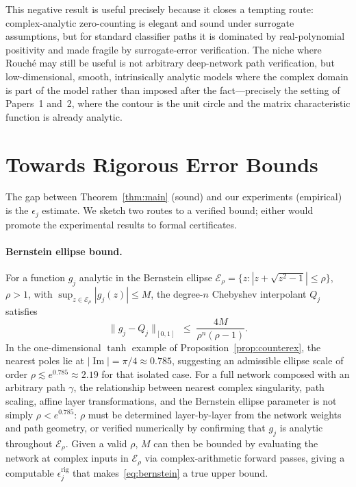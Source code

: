 \documentclass{article}
\theoremstyle{definition}
\begin{document}
This negative result is useful precisely because it closes a tempting route:
complex-analytic zero-counting is elegant and sound under surrogate
assumptions, but for standard classifier paths it is dominated by
real-polynomial positivity and made fragile by surrogate-error verification.
The niche where Rouch\'e may still be useful is not arbitrary deep-network
path verification, but low-dimensional, smooth, intrinsically analytic models
where the complex domain is part of the model rather than imposed after the
fact---precisely the setting of Papers~1 and~2, where the contour is the unit
circle and the matrix characteristic function is already analytic.

\appendix
\section{Towards Rigorous Error Bounds}
\label{app:rigorous}

The gap between Theorem~\ref{thm:main} (sound) and our experiments
(empirical) is the $\epsilon_j$ estimate.  We sketch two routes to a
verified bound; either would promote the experimental results to formal
certificates.

\paragraph{Bernstein ellipse bound.}
For a function $g_j$ analytic in the Bernstein ellipse
$\mathcal{E}_\rho = \{z : |z + \sqrt{z^2-1}| \leq \rho\}$, $\rho > 1$,
with $\sup_{z \in \mathcal{E}_\rho}|g_j(z)| \leq M$, the degree-$n$
Chebyshev interpolant $Q_j$ satisfies~\cite{trefethen2013approximation}
\begin{equation}
  \|g_j - Q_j\|_{[0,1]} \;\leq\; \frac{4M}{\rho^n(\rho - 1)}.
  \label{eq:bernstein}
\end{equation}
In the one-dimensional $\tanh$ example of
Proposition~\ref{prop:counterex}, the nearest poles lie at
$|\operatorname{Im}| = \pi/4 \approx 0.785$, suggesting an admissible
ellipse scale of order $\rho \lesssim e^{0.785} \approx 2.19$ for that
isolated case.  For a full network composed with an arbitrary path
$\gamma$, the relationship between nearest complex singularity, path
scaling, affine layer transformations, and the Bernstein ellipse parameter
is not simply $\rho < e^{0.785}$: $\rho$ must be determined
layer-by-layer from the network weights and path geometry, or verified
numerically by confirming that $g_j$ is analytic throughout
$\mathcal{E}_\rho$.  Given a valid $\rho$, $M$ can then be bounded by
evaluating the network at complex inputs in $\mathcal{E}_\rho$ via
complex-arithmetic forward passes, giving a computable
$\epsilon_j^{\mathrm{rig}}$ that makes~\eqref{eq:bernstein} a true
upper bound.
\end{document}
